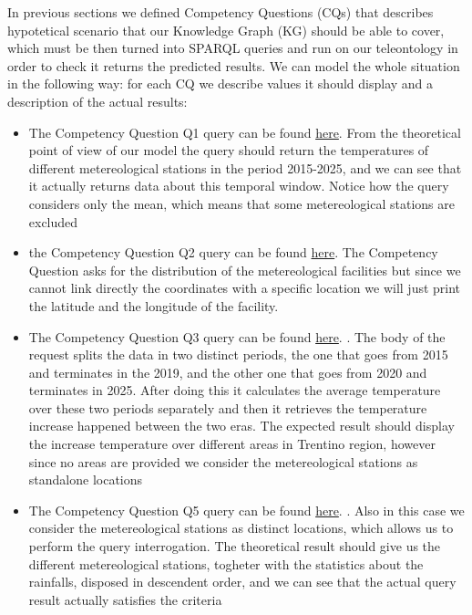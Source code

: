 In previous sections we defined Competency Questions (CQs) that describes hypotetical scenario
that our Knowledge Graph (KG) should be able to cover, which must be then turned into SPARQL queries
and run on our teleontology in order to check it returns the predicted results. We can model
the whole situation in the following way: for each CQ we describe
values it should display and a description of the actual results:
\begin{itemize}
	
	\item The Competency Question Q1 query can be found \href{https://github.com/zerise000/KG_Project2025_ClimateChange/blob/main/Evaluation/competencyQuestions/Q1.txt}{here}. 
	From the theoretical point of view of our model the query should
	return the temperatures of different metereological stations in
	the period 2015-2025, and we can see that it actually returns
	data about this temporal window. Notice how the query considers
	only the mean, which means that some metereological stations
	are excluded

	\item the Competency Question Q2 query can be found \href{https://github.com/zerise000/KG_Project2025_ClimateChange/blob/main/Evaluation/competencyQuestions/Q2.txt}{here}.
	The Competency Question asks for the distribution of the
	metereological facilities but since we cannot link directly
	the coordinates with a specific location we will just print
	the latitude and the longitude of the facility.
	
	\item The Competency Question Q3 query can be found \href{https://github.com/zerise000/KG_Project2025_ClimateChange/blob/main/Evaluation/competencyQuestions/Q3.txt}{here}.
.
	The body of the request splits the data in two distinct 
	periods, the one that goes from 2015 and terminates in
	the 2019, and the other one that goes from 2020 and terminates
	in 2025. After doing this it calculates the average temperature
	over these two periods separately and then it retrieves the
	temperature increase happened between the two eras. The expected 
	result should display the increase temperature over
	different areas in Trentino region, however since no areas
	are provided we consider the metereological stations as standalone
	locations

	\item The Competency Question Q5 query can be found \href{https://github.com/zerise000/KG_Project2025_ClimateChange/blob/main/Evaluation/competencyQuestions/Q5.txt}{here}.
.
	Also in this case we consider the metereological stations
	as distinct locations, which allows us to perform the query
	interrogation. The theoretical result should give us the
	different metereological stations, togheter with the statistics
	about the rainfalls, disposed in descendent order, and we can
	see that the actual query result actually satisfies the criteria 


\end{itemize}
